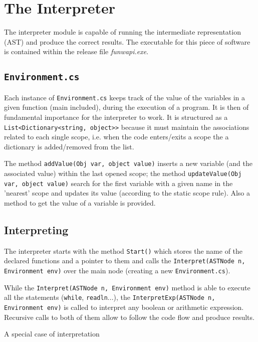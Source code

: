 \chapter{\label{chapter4} The \fwap Interpreter}

The interpreter module is capable of running the \fwap intermediate representation (AST) and produce the correct results. The executable for this piece of software is contained within the release file \textit{funwapi.exe}. 

\section{\texttt{Environment.cs}}

Each instance of \texttt{Environment.cs} keeps track of the value of the variables in a given function (main included), during the execution of a program. It is then of fundamental importance for the interpreter to work. It is structured as a \texttt{List<Dictionary<string, object>>} because it must maintain the associations related to each single scope, i.e. when the code enters/exits a scope the a dictionary is added/removed from the list.

The method \texttt{addValue(Obj var, object value)} inserts a new variable (and the associated value) within the last opened scope; the method \texttt{updateValue(Obj var, object value)} search for the first variable with a given name in the 'nearest' scope and updates its value (according to the static scope rule). Also a method to get the value of a variable is provided.

\section{Interpreting \fwap}

The interpreter starts with the method \texttt{Start()} which stores the name of the declared functions and a pointer to them and calls the \texttt{Interpret(ASTNode n, Environment env)} over the main node (creating a new \texttt{Environment.cs}). 

While the \texttt{Interpret(ASTNode n, Environment env)} method is able to execute all the statements (\texttt{while}, \texttt{readln}...), the \texttt{InterpretExp(ASTNode n, Environment env)} is called to interpret any boolean or arithmetic expression. Recursive calls to both of them allow to follow the code flow and produce results.

A special case of interpretation 
